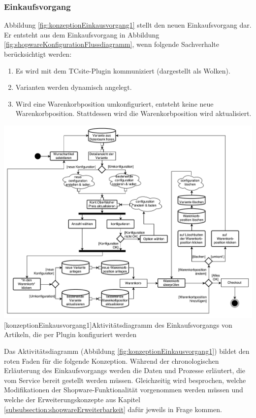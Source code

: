 \documentclass[11pt, a4paper, titlepage, listof=totoc, bibliography=totoc, index=totoc, twoside, openright, headings=normal]{scrreprt}
\begin{document}
\subsubsection{Einkaufsvorgang}
Abbildung \ref{fig:konzeptionEinkausvorgang1} stellt den neuen Einkaufsvorgang dar. Er entsteht aus dem Einkaufsvorgang in Abbildung \ref{fig:shopwareKonfigurationFlussdiagramm}, wenn folgende Sachverhalte berücksichtigt werden:
\begin{enumerate}
\item Es wird mit dem TCsite-Plugin kommuniziert (dargestellt als Wolken).
\item Varianten werden dynamisch angelegt.
\item Wird eine Warenkorbposition umkonfiguriert, entsteht keine neue Warenkorbposition. Stattdessen wird die Warenkorbposition wird aktualisiert.
\end{enumerate}

\vspace{1em}
\begin{minipage}{\linewidth}
	\centering
	\includegraphics[width=1\linewidth]{Abbildungen/konzeptionEinkausvorgang1.pdf}
	[konzeptionEinkausvorgang1]{Aktivitätsdiagramm des Einkaufsvorgangs von Artikeln, die per Plugin konfiguriert werden}
	\label{fig:konzeptionEinkausvorgang1}
\end{minipage}
\vspace{1em}

Das Aktivitätsdiagramm (Abbildung \ref{fig:konzeptionEinkausvorgang1}) bildet den \glqq roten Faden\grqq{} für die folgende Konzeption. Während der chronologischen Erläuterung des Einkaufsvorgangs werden die Daten und Prozesse erläutert, die vom Service bereit gestellt werden müssen. Gleichzeitig wird besprochen, welche Modifikationen der Shopware-Funktionalität vorgenommen werden müssen und welche der Erweiterungskonzepte aus Kapitel \ref{subsubsection:shopwareErweiterbarkeit} dafür jeweils in Frage kommen.
\end{document}
